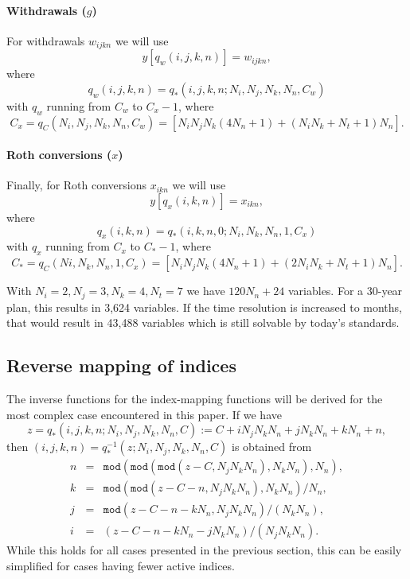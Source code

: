 \documentclass{article}[fleqn,12pt]
\begin{document}
\paragraph*{Withdrawals (\boldmath$g$)}
For withdrawals $w_{ijkn}$ we will use
\begin{equation}
	y[q_w(i, j, k, n)] = w_{i j k n},
\end{equation}
where
\begin{equation}
	q_w(i, j, k, n) = q_*(i, j, k, n; N_i, N_j, N_k, N_n, C_w)
\end{equation}
with $q_w$ running from $C_w$ to $C_x - 1$, where
\[
	C_x = q_C(N_i, N_j, N_k, N_n, C_w) = [N_iN_jN_k(4N_n + 1) + (N_iN_k + N_t + 1) N_n].
\]

\paragraph*{Roth conversions (\boldmath$x$)}
Finally, for Roth conversions $x_{ikn}$ we will use
\begin{equation}
	y[q_x(i, k, n)] = x_{i k n},
\end{equation}
where
\begin{equation}
	q_x(i, k, n) = q_*(i, k, n, 0; N_i, N_k, N_n, 1, C_x)
\end{equation}
with $q_x$ running from $C_x$ to $C_* - 1$, where
\[
	C_* = q_C(Ni, N_k, N_n, 1, C_x) = [N_iN_jN_k(4N_n + 1) + (2N_iN_k + N_t + 1) N_n].
\]

With $N_i = 2, N_j = 3, N_k = 4, N_t = 7$ we have $120N_n + 24$ variables. For
a 30-year plan, this results in 3,624 variables. If the time resolution is increased to
months, that would result in 43,488 variables which is still solvable by today's standards.

\subsection{Reverse mapping of indices}
The inverse functions for the index-mapping functions will be derived for the
most complex case encountered in this paper.
If we have
\begin{equation}
	z = q_*(i, j, k, n; N_i, N_j, N_k, N_n, C) := C + iN_jN_kN_n + jN_kN_n + kN_n + n,
\end{equation}
then $(i, j, k, n) = q_*^{-1}(z; N_i, N_j, N_k, N_n, C)$ is obtained from
\begin{eqnarray}
	n &=& \texttt{mod}(\texttt{mod}(\texttt{mod}(z - C, N_jN_kN_n), N_kN_n), N_n), \nonumber \\
	k &=& \texttt{mod}(\texttt{mod}(z - C - n, N_jN_kN_n), N_kN_n)/N_n, \nonumber \\
	j &=& \texttt{mod}(z - C - n - kN_n, N_jN_kN_n)/(N_kN_n), \nonumber \\
	i &=& (z - C - n - kN_n - jN_kN_n)/(N_jN_kN_n).
\end{eqnarray}
While this holds for all cases presented in the previous section, this can be easily simplified
for cases having fewer active indices.
\end{document}
